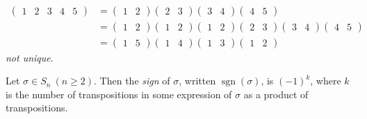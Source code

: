\begin{example} ~\vspace*{-1.5\baselineskip}
\begin{align*}
    \begin{pmatrix}1 & 2 & 3 & 4 & 5\end{pmatrix} &= \begin{pmatrix}1 & 2\end{pmatrix} \begin{pmatrix}2 & 3\end{pmatrix} \begin{pmatrix}3 & 4\end{pmatrix} \begin{pmatrix}4 & 5\end{pmatrix} \\
    &= \begin{pmatrix}1 & 2\end{pmatrix} \begin{pmatrix}1 & 2\end{pmatrix} \begin{pmatrix}1 & 2\end{pmatrix} \begin{pmatrix}2 & 3\end{pmatrix} \begin{pmatrix}3 & 4\end{pmatrix} \begin{pmatrix}4 & 5\end{pmatrix} \\
    &= \begin{pmatrix}1 & 5\end{pmatrix} \begin{pmatrix}1 & 4\end{pmatrix} \begin{pmatrix}1 & 3\end{pmatrix} \begin{pmatrix}1 & 2\end{pmatrix}
\end{align*}
\emph{not unique}.
\end{example}

\begin{definition}
Let $\sigma \in S_n \ (n \geq 2)$.
Then the \emph{sign} of $\sigma$, written $\operatorname{sgn}(\sigma)$, is $(-1)^k$, where $k$ is the number of transpositions in some expression of $\sigma$ as a product of transpositions.
\end{definition}

